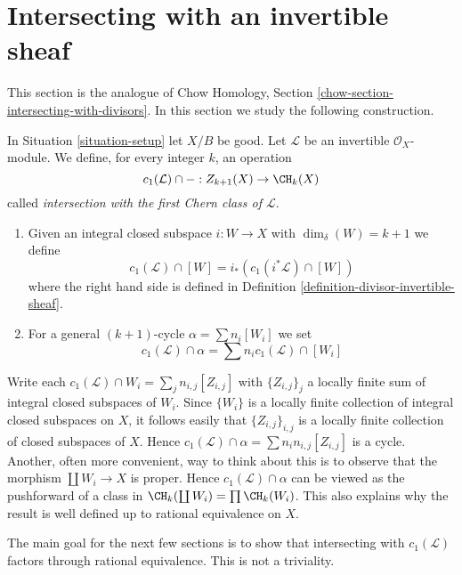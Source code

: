 








\section{Intersecting with an invertible sheaf}
\label{section-intersecting-with-divisors}

\noindent
This section is the analogue of
Chow Homology, Section \ref{chow-section-intersecting-with-divisors}.
In this section we study the following construction.

\begin{definition}
\label{definition-cap-c1}
In Situation \ref{situation-setup} let $X/B$ be good.
Let $\mathcal{L}$ be an invertible $\mathcal{O}_X$-module.
We define, for every integer $k$, an operation
$$
c_1(\mathcal{L}) \cap - :
Z_{k + 1}(X) \to \CH_k(X)
$$
called {\it intersection with the first Chern class of $\mathcal{L}$}.
\begin{enumerate}
\item Given an integral closed subspace $i : W \to X$ with
$\dim_\delta(W) = k + 1$ we define
$$
c_1(\mathcal{L}) \cap [W] = i_*(c_1({i^*\mathcal{L}}) \cap [W])
$$
where the right hand side is defined in
Definition \ref{definition-divisor-invertible-sheaf}.
\item For a general $(k + 1)$-cycle $\alpha = \sum n_i [W_i]$ we set
$$
c_1(\mathcal{L}) \cap \alpha = \sum n_i c_1(\mathcal{L}) \cap [W_i]
$$
\end{enumerate}
\end{definition}

\noindent
Write each $c_1(\mathcal{L}) \cap W_i = \sum_j n_{i, j} [Z_{i, j}]$
with $\{Z_{i, j}\}_j$ a locally finite sum
of integral closed subspaces of $W_i$. Since $\{W_i\}$ is a locally
finite collection of integral closed subspaces on $X$, it follows
easily that $\{Z_{i, j}\}_{i, j}$ is a locally finite collection
of closed subspaces of $X$. Hence
$c_1(\mathcal{L}) \cap \alpha = \sum n_in_{i, j}[Z_{i, j}]$
is a cycle. Another, often more convenient, way to think about this
is to observe that the morphism $\coprod W_i \to X$ is
proper. Hence $c_1(\mathcal{L}) \cap \alpha$ can be viewed
as the pushforward of a class in $\CH_k(\coprod W_i) = \prod \CH_k(W_i)$.
This also explains why the result is well defined up to rational
equivalence on $X$.

\medskip\noindent
The main goal for the next few sections is to show that intersecting with
$c_1(\mathcal{L})$ factors through rational equivalence.
This is not a triviality.

